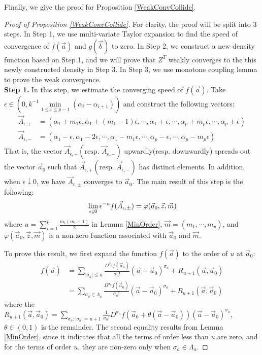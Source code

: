 Finally, we give the proof for Proposition \ref{WeakConvCollide}. 
\begin{proof}[Proof of Proposition \ref{WeakConvCollide}] For clarity, the proof will be split into $3$ steps. In Step 1, we use multi-variate Taylor expansion to find the speed of convergence of $f(\vec{a})$ and $g(\vec{b})$ to zero. In Step 2, we construct a new density function based on Step 1, and we will prove that $Z^{T}$ weakly converges to the this newly constructed density in Step 3. In Step 3, we use monotone coupling lemma to prove the weak convergence.\\
\textbf{Step 1. }In this step, we estimate the converging speed of $f(\vec{a})$. Take $\epsilon\in (0,k^{-1}\min\limits_{1\leqslant i\leqslant p-1}(\alpha_{i}-\alpha_{i+1}))$ and construct the following vectors:
\begin{align*}
	\vec{A}_{\epsilon,+}&=(\alpha_{1}+m_{1}\epsilon, \alpha_{1}+(m_{1}-1)\epsilon,\cdots,\alpha_{1}+\epsilon,\cdots,\alpha_{p}+m_{p}\epsilon,\cdots,\alpha_{p}+\epsilon)\\
	\vec{A}_{\epsilon,-}&=(\alpha_{1}-\epsilon, \alpha_{1}-2\epsilon,\cdots,\alpha_{1}-m_{1}\epsilon,\cdots,\alpha_{p}-\epsilon,\cdots,\alpha_{p}-m_{p}\epsilon)
\end{align*}
That is, the vector $\vec{A}_{\epsilon,+}(\text{resp. }\vec{A}_{\epsilon,-})$ upwardly(resp. downwardly) spreads out the vector $\vec{a}_{0}$ such that $\vec{A}_{\epsilon,+}(\text{resp. }\vec{A}_{\epsilon,-})$ has distinct elements. In addition, when $\epsilon\downarrow 0$, we have $\vec{A}_{\epsilon,\pm}$ converges to $\vec{a}_{0}$. The main result of this step is the following:
\begin{align}{\label{ConvSpeed}}
	\lim_{\epsilon\downarrow 0}\epsilon^{-u}f(\vec{A}_{\epsilon,\pm})=\varphi(\vec{a}_{0},\vec{z},\vec{m})
\end{align}
where $u=\sum_{i=1}^{p}\frac{m_{i}(m_{i}-1)}{2}$ in Lemma \ref{MinOrder}, $\vec{m}=(m_{1},\cdots,m_{p})$, and $\varphi(\vec{a}_{0},\vec{z},\vec{m})$ is a non-zero function associated with $\vec{a}_{0}$ and $\vec{m}$.

To prove this result, we first expand the function $f(\vec{a})$ to the order of $u$ at $\vec{a}_{0}$:
\begin{align*}
	f(\vec{a})&=\sum_{|\sigma_{a}|\leqslant u}\frac{D^{\sigma_{a}}f(\vec{a}_{0})}{\sigma_{a}!}(\vec{a}-\vec{a}_{0})^{\sigma_{a}}+R_{u+1}(\vec{a},\vec{a}_{0})\\
	&= \sum_{\sigma_{a}\in \Lambda_{a}}\frac{D^{\sigma_{a}}f(\vec{a}_{0})}{\sigma_{a}!}(\vec{a}-\vec{a}_{0})^{\sigma_{a}}+R_{u+1}(\vec{a},\vec{a}_{0})
\end{align*} 
where the $R_{u+1}(\vec{a},\vec{a}_{0})=\sum_{\sigma_{a}:|\sigma_{a}|=u+1}\frac{1}{\sigma_{a}!}D^{\sigma_{a}}f(\vec{a}_{0}+\theta(\vec{a}-\vec{a}_{0}))(\vec{a}-\vec{a}_{0})^{\sigma_{a}}$, $\theta\in(0,1)$ is the remainder. The second equality results from Lemma \ref{MinOrder}, since it indicates that all the terms of order less than $u$ are zero, and for the terms of order $u$, they are non-zero only when $\sigma_{a}\in\Lambda_{a}$.


\end{proof}
